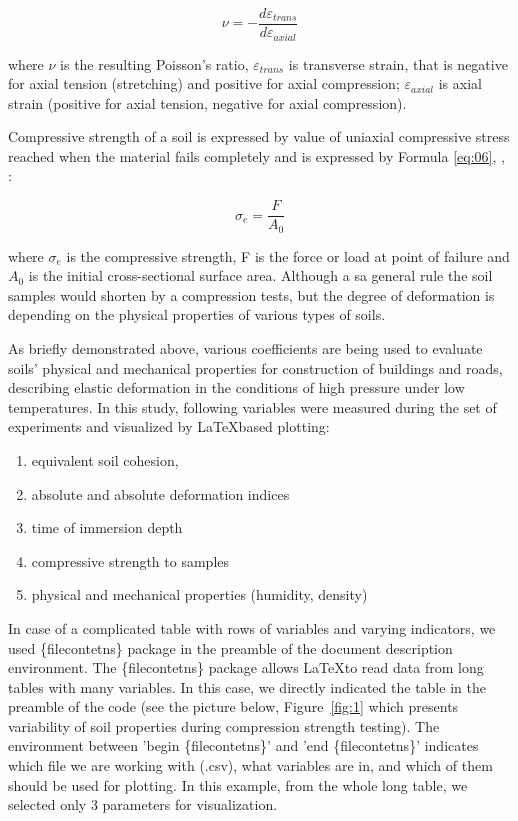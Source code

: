 \documentclass[a4paper,10pt]{article}
\begin{document}
\begin{equation}
	\nu=-\frac{d\varepsilon_{trans}}{d\varepsilon_{axial}}
\end{equation}\label{eq:05}

where $\nu$ is the resulting Poisson's ratio, $\varepsilon _{trans}$ is transverse strain, that is negative for axial tension (stretching) and positive for axial compression; $\varepsilon _{axial}$ is axial strain (positive for axial tension, negative for axial compression).

Compressive strength of a soil is expressed by value of uniaxial compressive stress reached when the material fails completely and is expressed by Formula \ref{eq:06}, \cite{Agterberg1964}, \cite{Agterberg1974}:  

\begin{equation}
	\sigma_{e}=\frac{F}{A_{0}}
\end{equation}\label{eq:06}

where $\sigma_{e}$ is the compressive strength, F is the force or load at point of failure and $A_{0}$ is the initial cross-sectional surface area. Although a sa general rule the soil samples would shorten by a compression tests, but the degree of deformation is depending on the physical properties of various types of soils. 

As briefly demonstrated above, various coefficients are being used to evaluate soils' physical and mechanical properties for construction of buildings and roads, describing elastic deformation in the conditions of high pressure under low temperatures. In this study, following variables were measured during the set of experiments and visualized by \LaTeX \space based plotting:

\begin{enumerate}[leftmargin=1cm]
	\item equivalent soil cohesion,
	\item absolute and absolute deformation indices	
	\item time of immersion depth
	\item compressive strength to samples
	\item physical and mechanical properties (humidity, density)
\end{enumerate}

In case of a complicated table with rows of variables and varying indicators, we used \{filecontetns\} package in the preamble of the document description environment. The \{filecontetns\} package allows \LaTeX\space to read data from long tables with many variables. In this case, we directly indicated the table in the preamble of the code (see the picture below, Figure~\ref{fig:1} which presents variability of soil properties during compression strength testing). The environment between 'begin \{filecontetns\}' and 'end \{filecontetns\}' indicates which file we are working with (.csv), what variables are in, and which of them should be used for plotting. In this example, from the whole long table, we selected only 3 parameters for visualization. 
\end{document}
